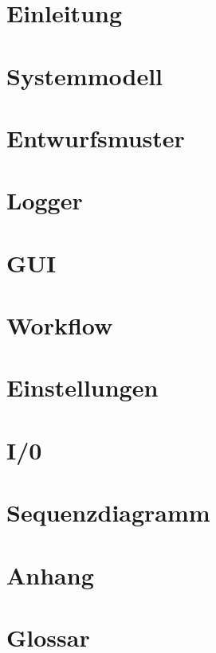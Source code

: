 

	\maketitle
	\setcounter{tocdepth}{1}
	\tableofcontents
	\chapter{Einleitung}
		
	\chapter{Systemmodell}
		
	\chapter{Entwurfsmuster}
		
	\chapter{Logger}
		
	\chapter{GUI}
		
	\chapter{Workflow}
		
	\chapter{Einstellungen}
		
	\chapter{I/0}
		
	\chapter{Sequenzdiagramm}
		
	\chapter{Anhang}
		
	\chapter{Glossar}
		
